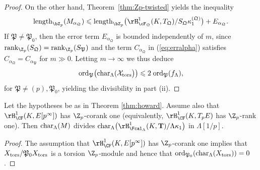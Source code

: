 \begin{proof}
On the other hand,
Theorem~\ref{thm:Zp-twisted} yields the inequality
\[
{\rm length}_{\bZ_p}(M_{\alpha_\mathfrak{Q}})\leqslant{\rm length}_{\bZ_p}\bigl(\rH^1_{\cF_{\mathfrak{Q}}}(K,T_{\mathfrak{Q}})/S_{\mathfrak{Q}}\kappa_1^{(\mathfrak{Q})}\bigr)+E_{\alpha_\mathfrak{Q}}.
\]
If $\mathfrak{P} \neq \mathfrak{P}_0$, then
the error term $E_{\alpha_\mathfrak{Q}}$ is bounded independently of $m$, since
${\rm rank}_{\Z_p}(S_{\mathfrak{Q}})={\rm rank}_{\Z_p}(S_{\mathfrak{P}})$ and the term $C_{\alpha_\mathfrak{Q}}$ in (\ref{eq:erralpha}) satisfies $C_{\alpha_\mathfrak{Q}}=C_{\alpha_\mathfrak{P}}$ for $m\gg 0$. Letting $m\to\infty$ we thus deduce
\[
{\rm ord}_{\mathfrak{P}}\bigl({\rm char}_\Lambda(\mathcal{X}_{\rm tors}\bigr)\bigr)\leqslant 2\;{\rm ord}_{\mathfrak{P}}(f_\Lambda),
\]
for $\mathfrak{P}\neq (p), \mathfrak{P}_0$, yielding the divisibility in part (ii).
\end{proof}

\begin{cor}
\notready\label{cor:howard}
Let the hypotheses be as in Theorem \ref{thm:howard}. Assume also that $\rH^1_{\CF}(K,E[p^\infty])$ has $\Z_p$-corank one (equivalently, $\rH^1_{\CF}(K,T_pE)$ has $\Z_p$-rank one).  Then
${\rm char}_\Lambda(M)$ divides ${\rm char}_\Lambda\bigl(\rH^1_{\Fcal_\Lambda}(K,\mathbf{T})/\Lambda\kappa_1\bigr)$ in $\Lambda[1/p]$.
\end{cor}

\begin{proof} The assumption that $\rH^1_{\CF}(K,E[p^\infty])$ has $\Z_p$-corank one implies that
$X_{\rm tors}/\mathfrak{P}_0X_{\rm tors}$ is a torsion $\Z_p$-module and hence that ${\rm ord}_{\mathfrak{P}_0}({\rm char}_\Lambda(X_{\rm tors})) =0$.
\end{proof}
